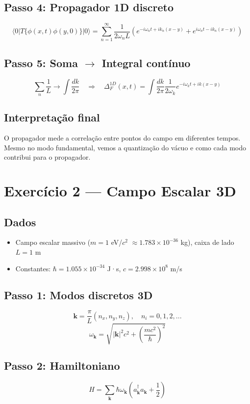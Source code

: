 \documentclass[12pt,a4paper]{article}
\begin{document}
\subsection{Passo 4: Propagador 1D discreto}
\[
\langle 0 | T\{\phi(x,t)\phi(y,0)\} | 0 \rangle = 
\sum_{n=1}^{\infty} \frac{1}{2 \omega_n L} \left( e^{-i \omega_n t + i k_n (x-y)} + e^{i \omega_n t - i k_n (x-y)} \right)
\]

\subsection{Passo 5: Soma $\rightarrow$ Integral contínuo}
\[
\sum_n \frac{1}{L} \to \int \frac{dk}{2\pi} \quad \Rightarrow \quad
\Delta_F^{1D}(x,t) = \int \frac{dk}{2\pi} \frac{1}{2\omega_k} e^{-i \omega_k t + i k (x-y)}
\]

\subsection{Interpretação final}
O propagador mede a correlação entre pontos do campo em diferentes tempos. Mesmo no modo fundamental, vemos a quantização do vácuo e como cada modo contribui para o propagador.

\newpage

\section{Exercício 2 — Campo Escalar 3D}
\subsection{Dados}
\begin{itemize}
    \item Campo escalar massivo (\(m = 1\) eV/$c^2$ \(\approx 1.783\times10^{-36}\) kg), caixa de lado \(L=1\) m
    \item Constantes: \(\hbar = 1.055\times 10^{-34}\) J·s, \(c = 2.998\times10^8\) m/s
\end{itemize}

\subsection{Passo 1: Modos discretos 3D}
\[
\mathbf{k} = \frac{\pi}{L} (n_x, n_y, n_z), \quad n_i = 0,1,2,...
\]
\[
\omega_\mathbf{k} = \sqrt{|\mathbf{k}|^2 c^2 + \left(\frac{m c^2}{\hbar}\right)^2}
\]

\subsection{Passo 2: Hamiltoniano}
\[
H = \sum_{\mathbf{k}} \hbar \omega_\mathbf{k} \left(a_\mathbf{k}^\dagger a_\mathbf{k} + \frac12\right)
\]
\end{document}
